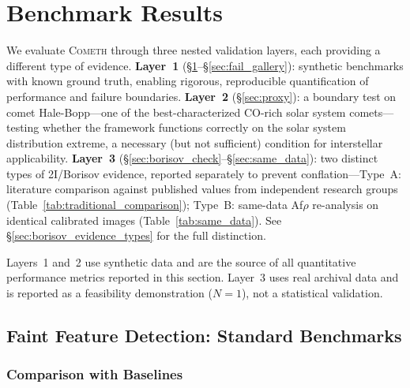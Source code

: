 \documentclass[usenatbib]{mnras}
\begin{document}
\section{Benchmark Results}\label{sec:results}

We evaluate \textsc{Cometh} through three nested validation layers, each providing a different type of evidence. \textbf{Layer~1} (\S\ref{sec:results}--\S\ref{sec:fail_gallery}): synthetic benchmarks with known ground truth, enabling rigorous, reproducible quantification of performance and failure boundaries. \textbf{Layer~2} (\S\ref{sec:proxy}): a boundary test on comet Hale-Bopp---one of the best-characterized CO-rich solar system comets---testing whether the framework functions correctly on the solar system distribution extreme, a necessary (but not sufficient) condition for interstellar applicability. \textbf{Layer~3} (\S\ref{sec:borisov_check}--\S\ref{sec:same_data}): two distinct types of 2I/Borisov evidence, reported separately to prevent conflation---Type~A: literature comparison against published values from independent research groups (Table~\ref{tab:traditional_comparison}); Type~B: same-data Af$\rho$ re-analysis on identical calibrated images (Table~\ref{tab:same_data}). See \S\ref{sec:borisov_evidence_types} for the full distinction.

Layers~1 and~2 use synthetic data and are the source of all quantitative performance metrics reported in this section. Layer~3 uses real archival data and is reported as a feasibility demonstration ($N=1$), not a statistical validation.

\subsection{Faint Feature Detection: Standard Benchmarks}

\subsubsection{Comparison with Baselines}
\end{document}
